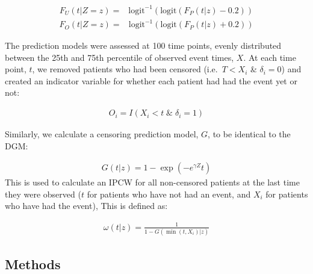 \documentclass[12pt,PhD,twoside,openright]{muthesis}
\newcommand{\txt}[1]{\textrm{#1}}
\def\logit{\txt{logit}}
\begin{document}
\[
\begin{array}{rl}
F_U(t|Z=z) =& \logit^{-1}\left(\logit\left( F_P(t|z) - 0.2\right)\right)
\end{array}
\]
\[
\begin{array}{rl}
F_O(t|Z=z) =& \logit^{-1}\left(\logit\left( F_P(t|z) + 0.2\right)\right)
\end{array}
\]

The prediction models were assessed at 100 time points, evenly distributed between the 25th and 75th percentile of observed event times, \(X\). At each time point, \(t\), we removed patients who had been censored (i.e.~\(T < X_i\) \& \(\delta_i = 0\))
and created an indicator variable for whether each patient had had the event yet or not:

\[
\begin{array}{c}
O_i = I(X_i < t\;\&\; \delta_i = 1)
\end{array}
\]

Similarly, we calculate a censoring prediction model, \(G\), to be identical to the DGM:

\[
\begin{array}{c}
G(t|z) = 1-\exp\left(-e^{\gamma Z}t\right)
\end{array}
\]
This is used to calculate an IPCW for all non-censored patients at the last time they were observed (\(t\) for patients who have not had an event, and \(X_i\) for patients who have had the event), This is defined as:

\[
\begin{array}{c}
\omega(t|z) = \frac{1}{1 - G(\min(t,X_i)|z)}
\end{array}
\]

\hypertarget{methods-5}{%
\subsection{Methods}\label{methods-5}}
\end{document}
